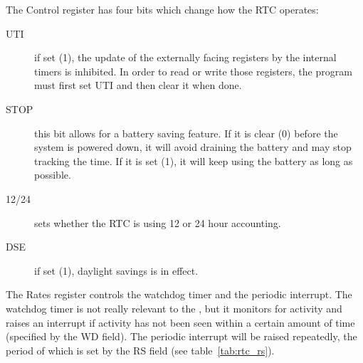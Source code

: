 The Control register has four bits which change how the RTC operates:
\begin{description}
    \item[UTI] if set (1), the update of the externally facing registers by the internal timers is inhibited. In order to read or write those registers, the program must first set UTI and then clear it when done.

    \item[STOP] this bit allows for a battery saving feature. If it is clear (0) before the system is powered down, it will avoid draining the battery and may stop tracking the time. If it is set (1), it will keep using the battery as long as possible.

    \item[12/24] sets whether the RTC is using 12 or 24 hour accounting.

    \item[DSE] if set (1), daylight savings is in effect.
\end{description}

The Rates register controls the watchdog timer and the periodic interrupt. The watchdog timer is not really relevant to the \jr, but it monitors for activity and raises an interrupt if activity has not been seen within a certain amount of time (specified by the WD field). The periodic interrupt will be raised repeatedly, the period of which is set by the RS field (see table~\ref{tab:rtc_rs}).

